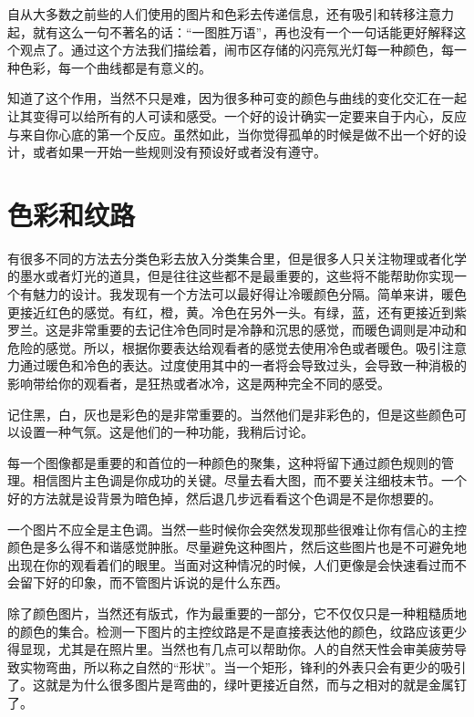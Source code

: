 

\noindent{}自从大多数之前些的人们使用的图片和色彩去传递信息，还有吸引和转移注意力起，就有这么一句不著名的话：“一图胜万语”，再也没有一个一句话能更好解释这个观点了。通过这个方法我们描绘着，闹市区存储的闪亮氖光灯每一种颜色，每一种色彩，每一个曲线都是有意义的。

知道了这个作用，当然不只是难，因为很多种可变的颜色与曲线的变化交汇在一起让其变得可以给所有的人可读和感受。一个好的设计确实一定要来自于内心，反应与来自你心底的第一个反应。虽然如此，当你觉得孤单的时候是做不出一个好的设计，或者如果一开始一些规则没有预设好或者没有遵守。

\section*{色彩和纹路}

有很多不同的方法去分类色彩去放入分类集合里，但是很多人只关注物理或者化学的墨水或者灯光的道具，但是往往这些都不是最重要的，这些将不能帮助你实现一个有魅力的设计。我发现有一个方法可以最好得让冷暖颜色分隔。简单来讲，暖色更接近红色的感觉。有红，橙，黄。冷色在另外一头。有绿，蓝，还有更接近到紫罗兰。这是非常重要的去记住冷色同时是冷静和沉思的感觉，而暖色调则是冲动和危险的感觉。所以，根据你要表达给观看者的感觉去使用冷色或者暖色。吸引注意力通过暖色和冷色的表达。过度使用其中的一者将会导致过头，会导致一种消极的影响带给你的观看者，是狂热或者冰冷，这是两种完全不同的感受。

记住黑，白，灰也是彩色的是非常重要的。当然他们是非彩色的，但是这些颜色可以设置一种气氛。这是他们的一种功能，我稍后讨论。

每一个图像都是重要的和首位的一种颜色的聚集，这种将留下通过颜色规则的管理。相信图片主色调是你成功的关键。尽量去看大图，而不要关注细枝末节。一个好的方法就是设背景为暗色掉，然后退几步远看看这个色调是不是你想要的。

一个图片不应全是主色调。当然一些时候你会突然发现那些很难让你有信心的主控颜色是多么得不和谐感觉肿胀。尽量避免这种图片，然后这些图片也是不可避免地出现在你的观看着们的眼里。当面对这种情况的时候，人们更像是会快速看过而不会留下好的印象，而不管图片诉说的是什么东西。

除了颜色图片，当然还有版式，作为最重要的一部分，它不仅仅只是一种粗糙质地的颜色的集合。检测一下图片的主控纹路是不是直接表达他的颜色，纹路应该更少得显现，尤其是在照片里。当然也有几点可以帮助你。人的自然天性会审美疲劳导致实物弯曲，所以称之自然的“形状”。当一个矩形，锋利的外表只会有更少的吸引了。这就是为什么很多图片是弯曲的，绿叶更接近自然，而与之相对的就是金属钉了。


